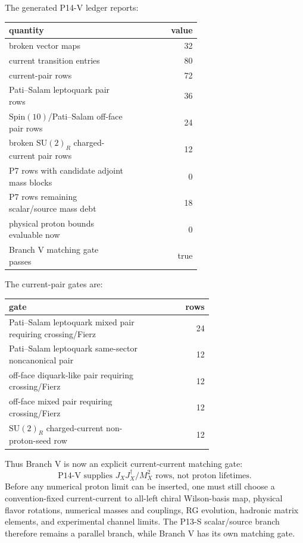 \documentclass[11pt]{article}
\newcommand{\SU}{\mathrm{SU}}
\newcommand{\Spin}{\mathrm{Spin}}
\begin{document}
The generated P14-V ledger reports:
\begin{center}
\small
\begin{tabular}{p{0.64\linewidth}r}
\toprule
quantity & value\\
\midrule
broken vector maps & 32\\
current transition entries & 80\\
current-pair rows & 72\\
Pati--Salam leptoquark pair rows & 36\\
$\Spin(10)$/Pati--Salam off-face pair rows & 24\\
broken $\SU(2)_R$ charged-current pair rows & 12\\
P7 rows with candidate adjoint mass blocks & 0\\
P7 rows remaining scalar/source mass debt & 18\\
physical proton bounds evaluable now & 0\\
Branch V matching gate passes & true\\
\bottomrule
\end{tabular}
\end{center}
The current-pair gates are:
\begin{center}
\small
\begin{tabular}{p{0.68\linewidth}r}
\toprule
gate & rows\\
\midrule
Pati--Salam leptoquark mixed pair requiring crossing/Fierz & 24\\
Pati--Salam leptoquark same-sector noncanonical pair & 12\\
off-face diquark-like pair requiring crossing/Fierz & 12\\
off-face mixed pair requiring crossing/Fierz & 12\\
$\SU(2)_R$ charged-current non-proton-seed row & 12\\
\bottomrule
\end{tabular}
\end{center}

Thus Branch V is now an explicit current-current matching gate:
\begin{equation}
  \boxed{
  \text{P14-V supplies }J_XJ_X^\dagger/M_X^2\text{ rows, not proton lifetimes.}
  }
\end{equation}
Before any numerical proton limit can be inserted, one must still choose a
convention-fixed current-current to all-left chiral Wilson-basis map, physical
flavor rotations, numerical masses and couplings, RG evolution, hadronic matrix
elements, and experimental channel limits.  The P13-S scalar/source branch
therefore remains a parallel branch, while Branch V has its own matching gate.
\end{document}
